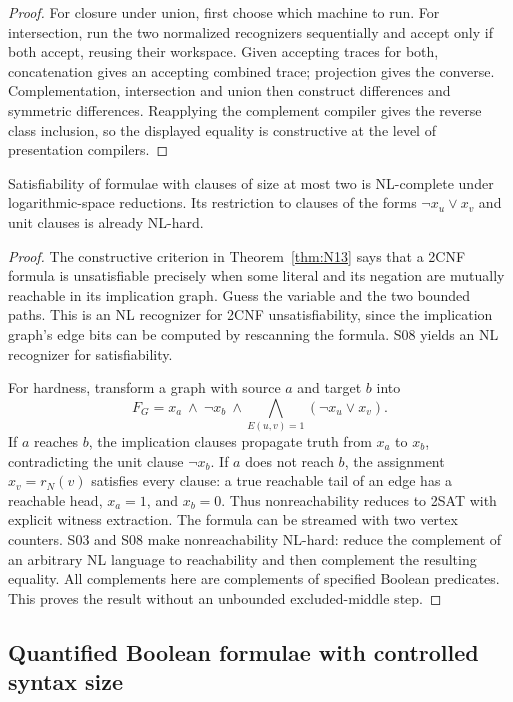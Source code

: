 \begin{proof}
For closure under union, first choose which machine to run.  For
intersection, run the two normalized recognizers sequentially and
accept only if both accept, reusing their workspace.  Given accepting
traces for both, concatenation gives an accepting combined trace;
projection gives the converse.  Complementation, intersection and union
then construct differences and symmetric differences.  Reapplying the
complement compiler gives the reverse class inclusion, so the displayed
equality is constructive at the level of presentation compilers.
\end{proof}

\begin{corollary}
\label{thm:S09}
Satisfiability of formulae with clauses of size at most two is
NL-complete under logarithmic-space reductions.  Its restriction to
clauses of the forms $\neg x_u\vee x_v$ and unit clauses is already
NL-hard.
\end{corollary}
\begin{proof}
The constructive criterion in Theorem~\ref{thm:N13} says that a 2CNF
formula is unsatisfiable precisely when some literal and its negation
are mutually reachable in its implication graph.  Guess the variable
and the two bounded paths.  This is an NL recognizer for 2CNF
unsatisfiability, since the implication graph's edge bits can be
computed by rescanning the formula.  S08 yields an NL recognizer for
satisfiability.

For hardness, transform a graph with source $a$ and target $b$ into
\[
 F_G=x_a\ \wedge\ \neg x_b\ \wedge\!
              \bigwedge_{E(u,v)=1}(\neg x_u\vee x_v).
 \tag{S.6}
\]
If $a$ reaches $b$, the implication clauses propagate truth from $x_a$
to $x_b$, contradicting the unit clause $\neg x_b$.  If $a$ does not
reach $b$, the assignment $x_v=r_N(v)$ satisfies every clause: a true
reachable tail of an edge has a reachable head, $x_a=1$, and $x_b=0$.
Thus nonreachability reduces to 2SAT with explicit witness extraction.
The formula can be streamed with two vertex counters.  S03 and S08
make nonreachability NL-hard: reduce the complement of an arbitrary NL
language to reachability and then complement the resulting equality.
All complements here are complements of specified Boolean predicates.
This proves the result without an unbounded excluded-middle step.
\end{proof}

\subsection{Quantified Boolean formulae with controlled syntax size}

